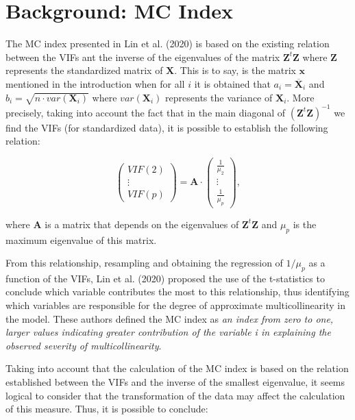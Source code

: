 \hypertarget{background-mc-index}{%
\section{Background: MC Index}\label{background-mc-index}}

The MC index presented in Lin et al. (2020) is based on the existing relation between the VIFs ant the inverse of the eigenvalues of the matrix \(\mathbf{Z}^{t} \mathbf{Z}\) where \(\mathbf{Z}\) represents the standardized matrix of \(\mathbf{X}\). This is to say, is the matrix \(\mathbf{x}\) mentioned in the introduction when for all \(i\) it is obtained that \(a_{i} = \overline{\mathbf{X}}_{i}\) and \(b_{i} = \sqrt{n \cdot var \left( \mathbf{X}_{i} \right)}\) where \(var \left( \mathbf{X}_{i} \right)\) represents the variance of \(\mathbf{X}_{i}\).
More precisely, taking into account the fact that in the main diagonal of \(\left( \mathbf{Z}^{t} \mathbf{Z} \right)^{-1}\) we find the VIFs (for standardized data), it is possible to establish the following relation:

\begin{equation}
\left(
\begin{array}{c}
VIF(2) \\
\vdots \\
VIF(p)
\end{array}
\right) = \mathbf{A} \cdot \left(
\begin{array}{c}
\frac{1}{\mu_{2}} \\
\vdots \\
\frac{1}{\mu_{p}}
\end{array}
\right),
\end{equation}

where \(\mathbf{A}\) is a matrix that depends on the eigenvalues of \(\mathbf{Z}^{t} \mathbf{Z}\) and \(\mu_{p}\) is the maximum eigenvalue of this matrix.

From this relationship, resampling and obtaining the regression of \(1/\mu_{p}\) as a function of the VIFs, Lin et al. (2020) proposed the use of the t-statistics to conclude which variable contributes the most to this relationship, thus identifying which variables are responsible for the degree of approximate multicollinearity in the model. These authors defined the MC index as \emph{an index from zero to one, larger values indicating greater contribution of the variable i in explaining the observed severity of multicollinearity}.

Taking into account that the calculation of the MC index is based on the relation established between the VIFs and the inverse of the smallest eigenvalue, it seems logical to consider that the transformation of the data may affect the calculation of this measure. Thus, it is possible to conclude:

